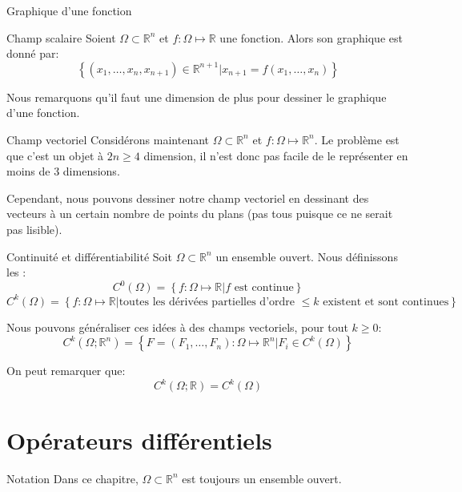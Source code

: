 \documentclass[a4paper]{article}
\begin{document}
\begin{parag}{Graphique d'une fonction}
    \begin{subparag}{Champ scalaire}
        Soient $\Omega \subset \mathbb{R}^n$ et $f: \Omega  \mapsto \mathbb{R}$ une fonction. Alors son graphique est donné par: 
        \[\left\{\left(x_1, \ldots, x_n, x_{n+1}\right) \in \mathbb{R}^{n+1} | x_{n+1} = f\left(x_1, \ldots, x_n\right)\right\}\]
        
        Nous remarquons qu'il faut une dimension de plus pour dessiner le graphique d'une fonction. 
    \end{subparag}
    
    \begin{subparag}{Champ vectoriel}
        Considérons maintenant $\Omega \subset \mathbb{R}^n$ et $f: \Omega \mapsto \mathbb{R}^n$. Le problème est que c'est un objet à $2n \geq 4$ dimension, il n'est donc pas facile de le représenter en moins de 3 dimensions.

        Cependant, nous pouvons dessiner notre champ vectoriel en dessinant des vecteurs à un certain nombre de points du plans (pas tous puisque ce ne serait pas lisible).
    \end{subparag}
\end{parag}

\begin{parag}{Continuité et différentiabilité}
    Soit $\Omega \subset \mathbb{R}^n$ un ensemble ouvert. Nous définissons les : 
    \[C^0 \left(\Omega\right) = \left\{f: \Omega \mapsto \mathbb{R} | f \text{ est continue}\right\}\]
    \[C^k\left(\Omega\right) = \left\{f: \Omega \mapsto \mathbb{R} | \text{toutes les dérivées partielles d'ordre $\leq k$ existent et sont continues}\right\}\]

    Nous pouvons généraliser ces idées à des champs vectoriels, pour tout $k \geq 0$: 
    \[C^k\left(\Omega; \mathbb{R}^n\right) = \left\{F = \left(F_1, \ldots, F_n\right) : \Omega \mapsto \mathbb{R}^n | F_i \in C^k\left(\Omega\right)\right\}\]

    On peut remarquer que: 
    \[C^k\left(\Omega; \mathbb{R}\right) = C^k\left(\Omega\right)\]
\end{parag}


\section{Opérateurs différentiels}

\begin{parag}{Notation}
    Dans ce chapitre, $\Omega \subset \mathbb{R}^n$ est toujours un ensemble ouvert.
\end{parag}
\end{document}
